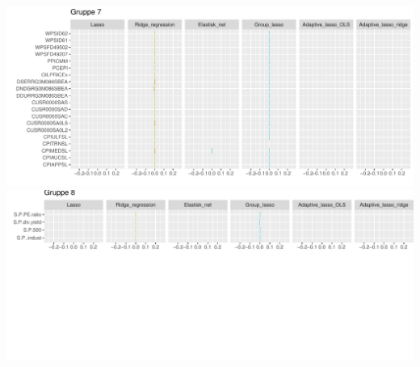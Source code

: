 \begin{landscape}
		\includegraphics[scale=0.75]{fig/img/coef_gr7.pdf} \\
		\includegraphics[scale=0.75, clip, trim=0 6cm 0 0]{fig/img/coef_gr8.pdf}
\end{landscape}

\begin{landscape}

\end{landscape}
